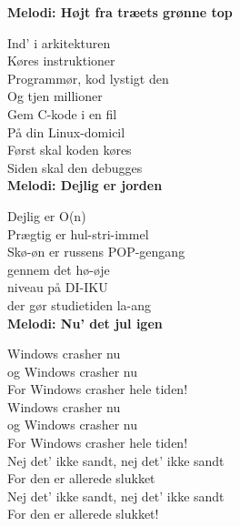 \vspace{-2.5mm}
\textbf{Melodi: Højt fra træets grønne top}

Ind' i arkitekturen\\
Køres instruktioner\\
Programmør, kod lystigt den\\
Og tjen millioner\\
Gem C-kode i en fil\\
På din Linux-domicil\\
Først skal koden køres\\
Siden skal den debugges\\

\vspace{-2.5mm}
\textbf{Melodi: Dejlig er jorden}

Dejlig er O(n)\\
Prægtig er hul-stri-immel\\
Skø-øn er russens POP-gengang\\
gennem det hø-øje\\
niveau på DI-IKU\\
der gør studietiden la-ang\\

\vspace{-2.5mm}
\textbf{Melodi: Nu' det jul igen}

Windows crasher nu\\
og Windows crasher nu\\
For Windows crasher hele tiden!\\
Windows crasher nu\\
og Windows crasher nu\\
For Windows crasher hele tiden!\\
Nej det' ikke sandt, nej det' ikke sandt\\
For den er allerede slukket\\
Nej det' ikke sandt, nej det' ikke sandt\\
For den er allerede slukket!
